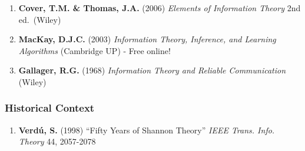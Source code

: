 \begin{enumerate}
\def\labelenumi{\arabic{enumi}.}
\setcounter{enumi}{2}
\tightlist
\item
  \textbf{Cover, T.M. \& Thomas, J.A.} (2006) \emph{Elements of
  Information Theory} 2nd ed.~(Wiley)
\item
  \textbf{MacKay, D.J.C.} (2003) \emph{Information Theory, Inference,
  and Learning Algorithms} (Cambridge UP) - Free online!
\item
  \textbf{Gallager, R.G.} (1968) \emph{Information Theory and Reliable
  Communication} (Wiley)
\end{enumerate}

\subsubsection{Historical Context}\label{historical-context}

\begin{enumerate}
\def\labelenumi{\arabic{enumi}.}
\setcounter{enumi}{5}
\tightlist
\item
  \textbf{Verdú, S.} (1998) ``Fifty Years of Shannon Theory'' \emph{IEEE
  Trans. Info. Theory} 44, 2057-2078
\end{enumerate}
